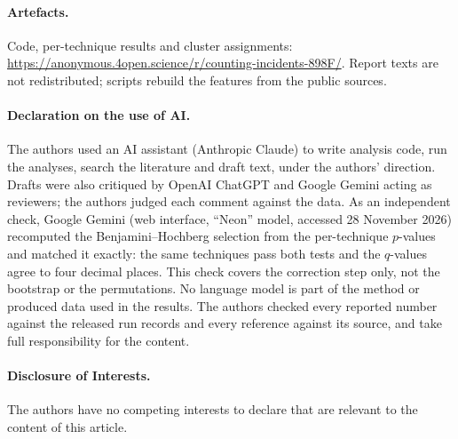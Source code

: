 \documentclass[runningheads]{llncs}
\begin{document}
\paragraph{Artefacts.} Code, per-technique results and cluster assignments: \url{https://anonymous.4open.science/r/counting-incidents-898F/}. Report texts are not redistributed; scripts rebuild the features from the public sources.

\paragraph{Declaration on the use of AI.} The authors used an AI assistant (Anthropic Claude) to write analysis code, run the analyses, search the literature and draft text, under the authors' direction. Drafts were also critiqued by OpenAI ChatGPT and Google Gemini acting as reviewers; the authors judged each comment against the data. As an independent check, Google Gemini (web interface, ``Neon'' model, accessed 28 November 2026) recomputed the Benjamini--Hochberg selection from the per-technique $p$-values and matched it exactly: the same techniques pass both tests and the $q$-values agree to four decimal places. This check covers the correction step only, not the bootstrap or the permutations. No language model is part of the method or produced data used in the results. The authors checked every reported number against the released run records and every reference against its source, and take full responsibility for the content.

\paragraph{Disclosure of Interests.} The authors have no competing interests to declare that are relevant to the content of this article.



\end{document}
